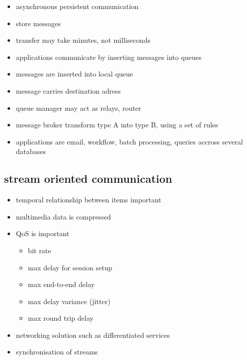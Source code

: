 \documentclass[ngerman,a4paper]{report}
\begin{document}
\begin{itemize}
	\item asynchronous persistent communication\\
	\item store messages
	\item transfer may take minutes, not milliseconds
	\item applications communicate by inserting messages into queues
	\item messages are inserted into local queue
	\item message carries destination adress
	\item queue manager may act as relays, router\\
	\item message broker transform type A into type B, using a set of rules
	\item applications are email, workflow, batch processing, queries accross several databases
\end{itemize}

\subsection{stream oriented communication}
\begin{itemize}
	\item temporal relationship between items important
	\item multimedia data is compressed
	\item QoS is important\\
		\begin{itemize}
			\item bit rate
			\item max delay for session setup
			\item max end-to-end delay
			\item max delay variance (jitter)
			\item max round trip delay\\
		\end{itemize}
	\item networking solution such as differentiated services
	\item synchronisation of streams
\end{itemize}
\end{document}
